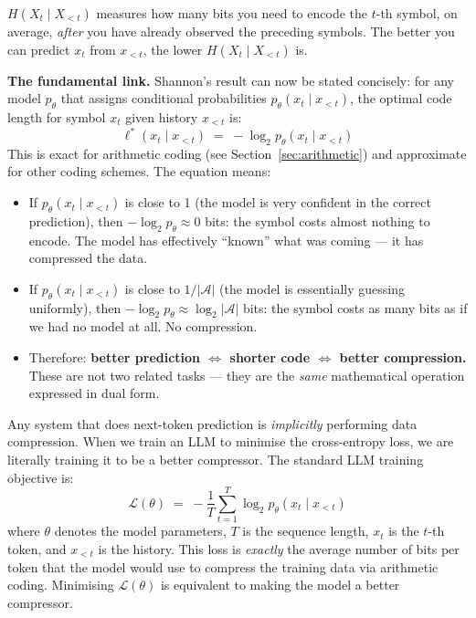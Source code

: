 \documentclass[11pt, a4paper]{article}
\begin{document}
$H(X_t \mid X_{<t})$ measures how many bits you need to encode the $t$-th
symbol, on average, \emph{after} you have already observed the preceding
symbols. The better you can predict $x_t$ from $x_{<t}$, the lower
$H(X_t \mid X_{<t})$ is.

\textbf{The fundamental link.} Shannon's result can now be stated
concisely: for any model $p_\theta$ that assigns conditional probabilities
$p_\theta(x_t \mid x_{<t})$, the optimal code length for symbol $x_t$
given history $x_{<t}$ is:
\[
\ell^*(x_t \mid x_{<t}) \;=\; -\log_2 p_\theta(x_t \mid x_{<t})
\]
This is exact for arithmetic coding (see Section~\ref{sec:arithmetic})
and approximate for other coding schemes. The equation means:
\begin{itemize}[leftmargin=2em]
  \item If $p_\theta(x_t \mid x_{<t})$ is close to 1 (the model is very
    confident in the correct prediction), then $-\log_2 p_\theta \approx 0$
    bits: the symbol costs almost nothing to encode. The model has
    effectively ``known'' what was coming --- it has compressed the data.

  \item If $p_\theta(x_t \mid x_{<t})$ is close to $1/|\mathcal{A}|$ (the
    model is essentially guessing uniformly), then
    $-\log_2 p_\theta \approx \log_2 |\mathcal{A}|$ bits: the symbol
    costs as many bits as if we had no model at all. No compression.

  \item Therefore: \textbf{better prediction $\Leftrightarrow$ shorter
    code $\Leftrightarrow$ better compression.} These are not two related
    tasks --- they are the \emph{same} mathematical operation expressed
    in dual form.
\end{itemize}

\begin{keyinsight}
Any system that does next-token prediction is \emph{implicitly} performing
data compression. When we train an LLM to minimise the cross-entropy
loss, we are literally training it to be a better compressor. The
standard LLM training objective is:
\[
\mathcal{L}(\theta) \;=\; -\frac{1}{T}\sum_{t=1}^{T}
\log_2 p_\theta(x_t \mid x_{<t})
\]
where $\theta$ denotes the model parameters, $T$ is the sequence length,
$x_t$ is the $t$-th token, and $x_{<t}$ is the history. This loss is
\emph{exactly} the average number of bits per token that the model would
use to compress the training data via arithmetic coding. Minimising
$\mathcal{L}(\theta)$ is equivalent to making the model a better
compressor.
\end{keyinsight}
\end{document}
